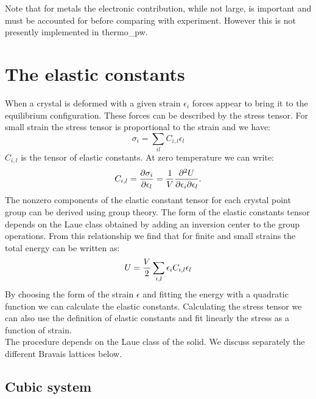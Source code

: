 \documentclass[12pt,a4paper]{article}
\def\tpw{{\sc thermo\_pw}}
\begin{document}
Note that for metals the electronic contribution, while not large, is important 
and must be accounted for before comparing with experiment. However this
is not presently implemented in \tpw.

\newpage
\section{\color{coral}The elastic constants}

When a crystal is deformed with a given strain $\epsilon_i$ forces
appear to bring it to the equilibrium configuration. These
forces can be described by the stress tensor. For small strain the 
stress tensor is proportional to the strain and we have:
\begin{equation}
\sigma_{i} =\sum_{il} C_{i,l} \epsilon_l 
\end{equation}
$C_{i,l}$ is the tensor of elastic constants. 
At zero temperature we can write:
\begin{equation}
C_{i,l}= {\partial \sigma_i \over \partial \epsilon_{l}}=
{1 \over V}{\partial^2 U \over \partial \epsilon_i \partial \epsilon_l}
.
\end{equation}
The nonzero components of the elastic constant tensor for each crystal point
group can be derived using group theory. The form of the elastic constants
tensor depends on the Laue class obtained by adding an inversion center to
the group operations. From this relationship we find that for finite
and small strains the total energy can be written as:
\begin{equation}
U= {V \over 2} \sum_{i,l} \epsilon_i C_{i,l} \epsilon_l
\end{equation}
By choosing the form of the strain $\epsilon$ and fitting the
energy with a quadratic function we can calculate the elastic constants.
Calculating the stress tensor we can also use the definition
of elastic constants and fit linearly the stress as a function of strain. \\
The procedure depends on the Laue class of the solid. We discuss separately
the different Bravais lattices below.

\subsection{\color{web-blue}Cubic system}
\end{document}
